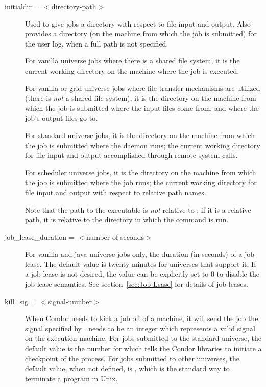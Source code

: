 \begin{description}

\item[initialdir = $<$directory-path$>$] 
Used to give jobs a directory with respect to file input and output.
Also provides a directory 
(on the machine from which the job is submitted)
for the user log, when a full path is not specified. 

For vanilla universe jobs where there is a shared file system,
it is the current working directory on the machine where the
job is executed.

For vanilla or grid universe jobs where file transfer mechanisms are
utilized (there is \emph{not} a shared file system),
it is the directory on the machine from which the job is submitted
where the input files come from, and where the job's output
files go to.

For standard universe jobs,
it is the directory on the machine from which the job is submitted
where the  daemon runs;
the current working directory for file input and output accomplished
through remote system calls.

For scheduler universe jobs,
it is the directory on the machine from which the job is submitted
where the job runs;
the current working directory for file input and output with
respect to relative path names.

Note that the path to the executable is \emph{not} relative to
; if it is a relative path, it is relative to the
directory in which the  command is run.


\item[job\_lease\_duration = $<$number-of-seconds$>$] For vanilla
and java universe jobs only, the duration (in seconds) of a
job lease.
The default value is twenty minutes for universes that support it.
If a job lease is not desired, the value can be explicitly set to 0 to
disable the job lease semantics.
See section~\ref{sec:Job-Lease} for details of job leases.



\item[kill\_sig = $<$signal-number$>$] When Condor needs to kick a job
off of a machine, it will send the job the signal specified by
.
 needs to be an integer which
represents a valid signal on the execution machine.  For jobs submitted
to the standard universe, the default value is the number for
\verb@SIGTSTP@ which tells the Condor libraries to initiate a checkpoint
of the process.  For jobs submitted to other universes,
the default value, when not defined,
is \verb@SIGTERM@, which is the standard way to terminate a program in Unix.  


\end{description}
